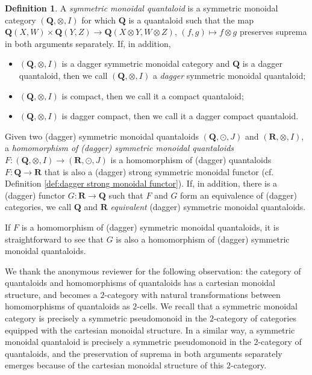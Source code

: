 \documentclass[12pt]{tac}
\theoremstyle{definition}
\newtheorem{definition}[theorem]{Definition}
\theoremstyle{remark}
\newcommand{\<}{\langle}
\renewcommand{\>}{\rangle}
\renewcommand{\:}{\colon}
\begin{document}
\begin{definition}
   A \emph{symmetric monoidal quantaloid} is a symmetric monoidal category $(\mathbf Q,\otimes, I)$ for which $\mathbf Q$ is a quantaloid such that the map $\mathbf Q(X,W)\times\mathbf Q(Y,Z)\to\mathbf Q(X\otimes Y,W\otimes Z)$, $(f,g)\mapsto f\otimes g$ preserves suprema in both arguments separately. If, in addition, 
   \begin{itemize}
       \item $(\mathbf Q,\otimes,I)$ is a dagger symmetric monoidal category and $\mathbf Q$ is a dagger quantaloid, then we call $(\mathbf Q,\otimes,I)$ a \emph{dagger} symmetric monoidal quantaloid;
       \item $(\mathbf Q,\otimes,I)$ is compact, then we call it a compact quantaloid;
       \item $(\mathbf Q,\otimes,I)$ is dagger compact, then we call it a dagger compact quantaloid. 
       \end{itemize}
Given two (dagger) symmetric monoidal quantaloids $(\mathbf Q,\odot,J)$ and $(\mathbf R,\otimes,I)$, a \emph{homomorphism of (dagger) symmetric monoidal quantaloids} $F:(\mathbf Q,\otimes,I)\to(\mathbf R,\odot, J)$ is a homomorphism of (dagger) quantaloids $F:\mathbf Q\to\mathbf R$ that is also a (dagger) strong symmetric monoidal functor (cf. Definition \ref{def:dagger strong monoidal functor}). If, in addition, there is a (dagger) functor $G:\mathbf R\to\mathbf Q$ such that $F$ and $G$ form an equivalence of (dagger) categories, we call $\mathbf Q$ and $\mathbf R$ \emph{equivalent} (dagger) symmetric monoidal quantaloids.
\end{definition}
If $F$ is a homomorphism of (dagger) symmetric monoidal quantaloids, it is straightforward to see that $G$ is also a homomorphism of (dagger) symmetric monoidal quantaloids.

We thank the anonymous reviewer for the following observation: the category of quantaloids and homomorphisms of quantaloids has a cartesian monoidal structure, and becomes a $2$-category with natural transformations between homomorphisms of quantaloids as $2$-cells. We recall that a symmetric monoidal category is precisely a symmetric pseudomonoid in the $2$-category of categories equipped with the cartesian monoidal structure. In a similar way, a symmetric monoidal quantaloid is precisely a symmetric pseudomonoid in the $2$-category of quantaloids, and the preservation of suprema in both arguments separately emerges because of the cartesian monoidal structure of this $2$-category. 
\end{document}
